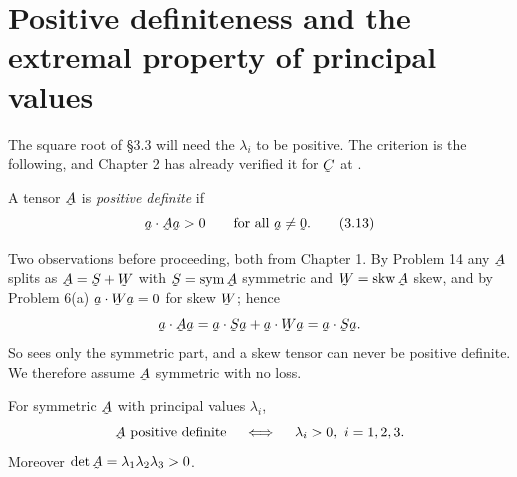\section{Positive definiteness and the extremal property
         of principal values}\label{sec:posdef}

The square root of \S3.3 will need the $\lambda_{i}$ to be positive. The
criterion is the following, and Chapter 2 has already verified it for $\bC$
at .

\begin{definition}\label{def:pd}
A tensor $\bA$ is \emph{positive definite} if
\begin{equation}
   \ip{\ba}{\bA\ba}>0\qquad\text{for all }\ba\neq\bze .
   \tag{3.13}\label{eq:3.13}
\end{equation}
\end{definition}

Two observations before proceeding, both from Chapter 1. By Problem 14 any
$\bA$ splits as $\bA=\bS+\bW$ with $\bS=\Sym\bA$ symmetric and
$\bW=\Skw\bA$ skew, and by Problem 6(a) $\ip{\ba}{\bW\ba}=0$ for skew
$\bW$; hence
\[
   \ip{\ba}{\bA\ba}=\ip{\ba}{\bS\ba}+\ip{\ba}{\bW\ba}=\ip{\ba}{\bS\ba}.
\]
So  sees only the symmetric part, and a skew tensor can never be
positive definite. We therefore assume $\bA$ symmetric with no loss.

\begin{theorem}
\label{thm:pdiff}
For symmetric $\bA$ with principal values $\lambda_{i}$,
\[
   \bA\ \text{positive definite}\quad\iff\quad\lambda_{i}>0,\ i=1,2,3 .
\]
Moreover $\det\bA=\lambda_{1}\lambda_{2}\lambda_{3}>0$.
\end{theorem}

